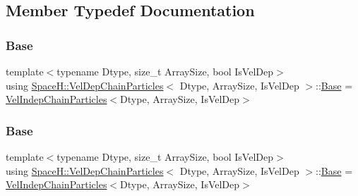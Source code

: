 \subsection{Member Typedef Documentation}
\mbox{\label{class_space_h_1_1_vel_dep_chain_particles_aca1c605196c7fff9e15ea7ed97da7cfe}} 
\subsubsection{\texorpdfstring{Base}{Base}\hspace{0.1cm}{\footnotesize\ttfamily [1/2]}}
{\footnotesize\ttfamily template$<$typename Dtype, size\+\_\+t Array\+Size, bool Is\+Vel\+Dep$>$ \\
using \mbox{\hyperlink{class_space_h_1_1_vel_dep_chain_particles}{Space\+H\+::\+Vel\+Dep\+Chain\+Particles}}$<$ Dtype, Array\+Size, Is\+Vel\+Dep $>$\+::\mbox{\hyperlink{class_space_h_1_1_vel_indep_chain_particles_a071fb842f4ccb3ff01015c1105302e8a}{Base}} =  \mbox{\hyperlink{class_space_h_1_1_vel_indep_chain_particles}{Vel\+Indep\+Chain\+Particles}}$<$Dtype, Array\+Size, Is\+Vel\+Dep$>$}

\mbox{\label{class_space_h_1_1_vel_dep_chain_particles_aca1c605196c7fff9e15ea7ed97da7cfe}} 
\subsubsection{\texorpdfstring{Base}{Base}\hspace{0.1cm}{\footnotesize\ttfamily [2/2]}}
{\footnotesize\ttfamily template$<$typename Dtype, size\+\_\+t Array\+Size, bool Is\+Vel\+Dep$>$ \\
using \mbox{\hyperlink{class_space_h_1_1_vel_dep_chain_particles}{Space\+H\+::\+Vel\+Dep\+Chain\+Particles}}$<$ Dtype, Array\+Size, Is\+Vel\+Dep $>$\+::\mbox{\hyperlink{class_space_h_1_1_vel_indep_chain_particles_a071fb842f4ccb3ff01015c1105302e8a}{Base}} =  \mbox{\hyperlink{class_space_h_1_1_vel_indep_chain_particles}{Vel\+Indep\+Chain\+Particles}}$<$Dtype, Array\+Size, Is\+Vel\+Dep$>$}

